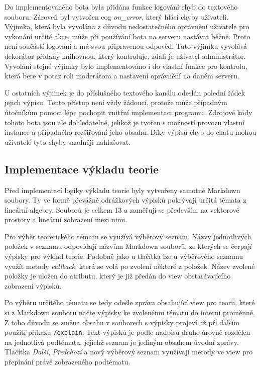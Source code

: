 \documentclass[FM]{tulthesis}
\begin{document}
	Do implementovaného bota byla přidána funkce logování chyb do textového souboru. Zároveň byl vytvořen cog \textit{on\_error}, který hlásí chyby uživateli. Výjimka, která byla vyvolána z důvodu nedostatečného oprávnění uživatele pro vykonání určité akce, může při používání bota na serveru nastávat běžně. Proto není součástí logování a má svou připravenou odpověď. Tuto výjimku vyvolává dekorátor přidaný knihovnou, který kontroluje, zdali je uživatel administrátor. Vyvolání stejné výjimky bylo implementováno i do vlastní funkce pro kontrolu, která bere v potaz roli moderátora a nastavení oprávnění na daném serveru.
	
	U ostatních výjimek je do příslušného textového kanálu odeslán polední řádek jejich výpisu. Tento přístup není vždy žádoucí, protože může případným útočníkům pomoci lépe pochopit vnitřní implementaci programu. Zdrojové kódy tohoto bota jsou ale dohledatelné, jelikož je tvořen s možností provozu vlastní instance a případného rozšiřování jeho obsahu. Díky výpisu chyb do chatu mohou uživatelé tyto chyby snadněji nahlašovat.
	
	
	\subsection{Implementace výkladu teorie}

	Před implementací logiky výkladu teorie byly vytvořeny samotné Markdown soubory. Ty ve formě převážně odrážkových výpisků pokrývají určitá témata z lineární algebry. Souborů je celkem 13 a zaměřují se především na vektorové prostory a lineární zobrazení mezi nimi.

	Pro výběr teoretického tématu se využívá výběrový seznam. Názvy jednotlivých položek v seznamu odpovídají názvům Markdown souborů, ze kterých se čerpají výpisky pro výklad teorie. Podobně jako u tlačítka lze u výběrového seznamu využít metody \textit{callback}, která se volá po zvolení některé z položek. Název zvolené položky je uložen do atributu, který je již předán do view obstarávajícího zobrazení výpisků.%
	
	Po výběru určitého tématu se tedy odešle zpráva obsahující view pro teorii, které si z Markdown souboru načte výpisky ke zvolenému tématu do interní proměnné. Z toho důvodu se změna obsahu v souborech s výpisky projeví až při dalším použití příkazu \verb|/explain|. Text výpisků je podle nadpisů druhé úrovně rozdělen na jednotlivá podtémata, jejichž seznam je jediným obsahem úvodní zprávy. Tlačítka \textit{Další}, \textit{Předchozí} a nový výběrový seznam využívají metody ve view pro přepínání právě zobrazeného podtématu.
	
\end{document}
